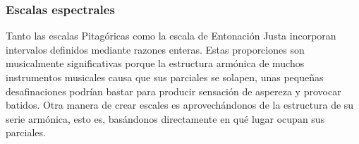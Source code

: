 \documentclass[11pt,a4paper]{article}
\begin{document}
    
%            
%            
	
	\subsubsection{Escalas espectrales}
	
	Tanto las escalas Pitagóricas como la escala de Entonación Justa incorporan intervalos definidos mediante razones enteras. Estas proporciones son musicalmente significativas porque la estructura armónica de muchos instrumentos musicales causa que sus parciales se solapen, unas pequeñas desafinaciones podrían bastar para producir sensación de aspereza y provocar batidos. Otra manera de crear escales es aprovechándonos de la estructura de su serie armónica, esto es, basándonos directamente en qué lugar ocupan sus parciales.
	
\end{document}
